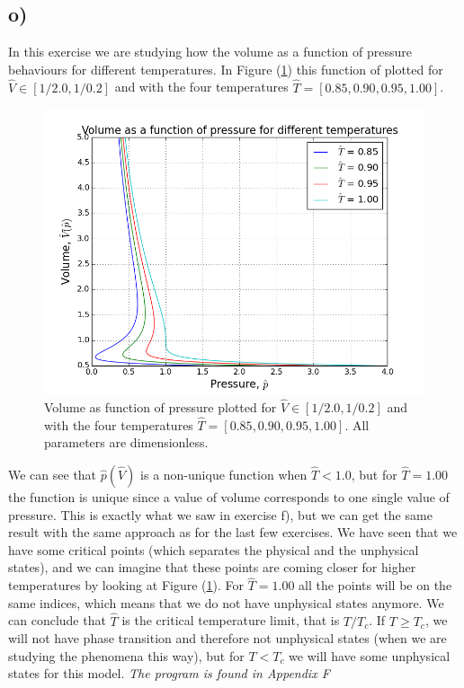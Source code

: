 \documentclass{scrartcl}
\begin{document}
\subsection*{o)}
In this exercise we are studying how the volume as a function of pressure behaviours for different temperatures. In Figure (\ref{fig:o}) this function of plotted for $\hat{V}\in[1/2.0, 1/0.2]$ and with the four temperatures $\hat{T}=[0.85, 0.90, 0.95, 1.00]$. 
\begin{figure}[H]
\centering
\includegraphics[width=150mm]{oblig3_7.png}
\caption{Volume as function of pressure plotted for $\hat{V}\in[1/2.0, 1/0.2]$ and with the four temperatures $\hat{T}=[0.85, 0.90, 0.95, 1.00]$. All parameters are dimensionless.}
\label{fig:o}
\end{figure}
We can see that $\hat{p}(\hat{V})$ is a non-unique function when $\hat{T}<1.0$, but for $\hat{T}=1.00$ the function is unique since a value of volume corresponds to one single value of pressure. This is exactly what we saw in exercise f), but we can get the same result with the same approach as for the last few exercises. We have seen that we have some critical points (which separates the physical and the unphysical states), and we can imagine that these points are coming closer for higher temperatures by looking at Figure (\ref{fig:o}). For $\hat{T}=1.00$ all the points will be on the same indices, which means that we do not have  unphysical states anymore. We can conclude that $\hat{T}$ is the critical temperature limit, that is $T/T_c$. If $T\ge T_c$, we will not have phase transition and therefore not unphysical states (when we are studying the phenomena this way), but for $T<T_c$ we will have some unphysical states for this model. 
\newline\textit{The program is found in Appendix F}
\newpage
\end{document}
